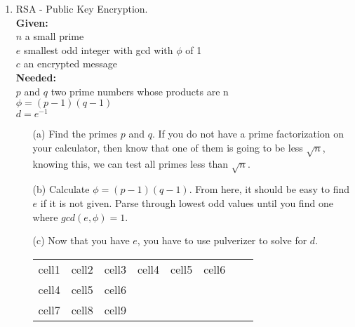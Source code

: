 \documentclass[12pt]{amsart}
\begin{document}
\begin{enumerate}
\item RSA - Public Key Encryption. \\
{\bf Given: }\\ $n$ a small prime\\ $e$ smallest odd integer with gcd with $\phi$ of 1\\ $c$ an encrypted message\\
{\bf Needed: }\\ $p$ and $q$ two prime numbers whose products are n\\ $\phi = (p-1)(q-1)$\\
$d = e^{-1}$\\
\begin{itemize}
\item[(a)] Find the primes $p$ and $q$.  If you do not have a prime factorization on your calculator, then know that one of them is going to be less $\sqrt{n}$, knowing this, we can test all primes less than $\sqrt{n}$.\\
\item[(b)] Calculate $\phi = (p-1)(q-1)$.  From here, it should be easy to find $e$ if it is not given.  Parse through lowest odd values until you find one where $gcd(e, \phi) = 1$.\\
\item[(c)] Now that you have $e$, you have to use pulverizer to solve for $d$. 

\begin{center}
\begin{tabular}{ |cccc|cccc| } 
 \hline
 cell1 & cell2 & cell3 & cell4 & cell5 & cell6 \vline \\ 
 cell4 & cell5 & cell6 \vline \\ 
 cell7 & cell8 & cell9 \vline \\ 
 \hline
\end{tabular}
\end{center}

\end{itemize}

\end{enumerate}
\end{document}
